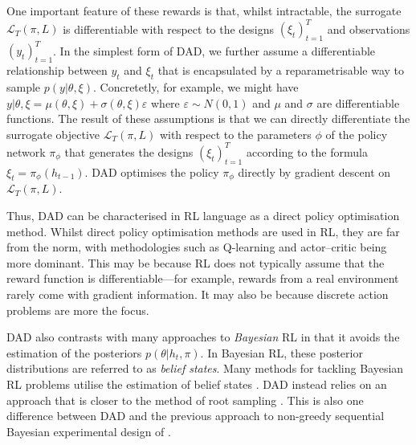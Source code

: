 \documentclass[a4paper, 10pt]{report}
\theoremstyle{plain}
\begin{document}
	One important feature of these rewards is that, whilst intractable, the surrogate $\mathcal{L}_T(\pi,L)$ is differentiable with respect to the designs $(\xi_t)_{t=1}^T$ and observations $(y_t)_{t=1}^T$. In the simplest form of DAD, we further assume a differentiable relationship between $y_t$ and $\xi_t$ that is encapsulated by a reparametrisable way to sample $p(y|\theta,\xi)$. Concretetly, for example, we might have $y|\theta,\xi = \mu(\theta,\xi) + \sigma(\theta,\xi)\varepsilon$ where $\varepsilon \sim N(0,1)$ and $\mu$ and $\sigma$ are differentiable functions.
	The result of these assumptions is that we can directly differentiate the surrogate objective $\mathcal{L}_T(\pi,L)$ with respect to the parameters $\phi$ of the policy network $\pi_\phi$ that generates the designs $(\xi_t)_{t=1}^T$ according to the formula $\xi_t = \pi_\phi(h_{t-1})$.
	DAD optimises the policy $\pi_\phi$ directly by gradient descent on $\mathcal{L}_T(\pi,L)$.
	
	Thus, DAD can be characterised in RL language as a direct policy optimisation method. Whilst direct policy optimisation methods \citep{lorberbom2019direct,howell2021direct} are used in RL, they are far from the norm, with methodologies such as Q-learning \citep{watkins1992q} and actor--critic \citep{konda2000actor} being more dominant.
	This may be because RL does not typically assume that the reward function is differentiable---for example, rewards from a real environment rarely come with gradient information. It may also be because discrete action problems are more the focus.
	
	DAD also contrasts with many approaches to \emph{Bayesian} RL in that it avoids the estimation of the posteriors $p(\theta|h_t,\pi)$.
	In Bayesian RL, these posterior distributions are referred to as \emph{belief states}.
	Many methods for tackling Bayesian RL problems utilise the estimation of belief states \citep{ghavamzadeh2016bayesian,igl2018deep,zintgraf2019varibad}.
	DAD instead relies on an approach that is closer to the method of root sampling \citep{guez2012efficient}.
	This is also one difference between DAD and the previous approach to non-greedy sequential Bayesian experimental design of \citet{huan2016sequential}.
	
\end{document}
